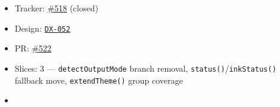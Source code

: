 \begin{itemize}
\tightlist
\item
  Tracker: \href{https://github.com/flyingrobots/bijou/issues/518}{\#518} (closed)
\item
  Design: \href{https://github.com/flyingrobots/bijou/blob/cbd70612140e7a450d764b3c7be1c6af878b99bc/docs/design/DX-052-no-color-is-not-a-capability.md}{\texttt{D\allowbreak{}X\allowbreak{}-\allowbreak{}0\allowbreak{}5\allowbreak{}2}}
\item
  PR: \href{https://github.com/flyingrobots/bijou/pull/522}{\#522}
\item
  Slices: 3 --- \texttt{d\allowbreak{}e\allowbreak{}t\allowbreak{}e\allowbreak{}c\allowbreak{}t\allowbreak{}O\allowbreak{}u\allowbreak{}t\allowbreak{}p\allowbreak{}u\allowbreak{}t\allowbreak{}M\allowbreak{}o\allowbreak{}d\allowbreak{}e} branch removal, \texttt{s\allowbreak{}t\allowbreak{}a\allowbreak{}t\allowbreak{}u\allowbreak{}s\allowbreak{}(\allowbreak{})}/\texttt{i\allowbreak{}n\allowbreak{}k\allowbreak{}S\allowbreak{}t\allowbreak{}a\allowbreak{}t\allowbreak{}u\allowbreak{}s\allowbreak{}(\allowbreak{})} fallback move, \texttt{e\allowbreak{}x\allowbreak{}t\allowbreak{}e\allowbreak{}n\allowbreak{}d\allowbreak{}T\allowbreak{}h\allowbreak{}e\allowbreak{}m\allowbreak{}e\allowbreak{}(\allowbreak{})} group coverage
\item

\end{itemize}
